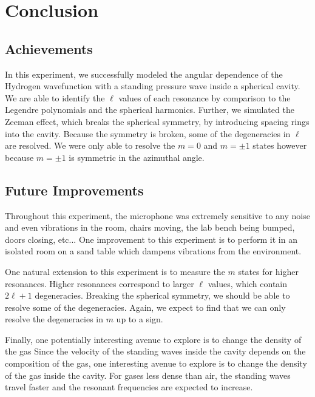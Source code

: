 \documentclass[12pt]{article}
\begin{document}
\section{Conclusion}

	\subsection{Achievements}
	In this experiment, we successfully modeled the angular dependence of the Hydrogen wavefunction with a standing pressure wave inside a spherical cavity. We are able to identify the $\ell$ values of each resonance by comparison to the Legendre polynomials and the spherical harmonics. Further, we simulated the Zeeman effect, which breaks the spherical symmetry, by introducing spacing rings into the cavity. Because the symmetry is broken, some of the degeneracies in $\ell$ are resolved. We were only able to resolve the $m=0$ and $m=\pm1$ states however because $m=\pm1$ is symmetric in the azimuthal angle.

	\subsection{Future Improvements}
	Throughout this experiment, the microphone was extremely sensitive to any noise and even vibrations in the room, chairs moving, the lab bench being bumped, doors closing, etc... One improvement to this experiment is to perform it in an isolated room on a sand table which dampens vibrations from the environment.
	
	One natural extension to this experiment is to measure the $m$ states for higher resonances. Higher resonances correspond to larger $\ell$ values, which contain $2\ell + 1$ degeneracies. Breaking the spherical symmetry, we should be able to resolve some of the degeneracies. Again, we expect to find that we can only resolve the degeneracies in $m$ up to a sign. 
	
	Finally, one potentially interesting avenue to explore is to change the density of the gas 
	Since the velocity of the standing waves inside the cavity depends on the composition of the gas, one interesting avenue to explore is to change the density of the gas inside the cavity. For gases less dense than air, the standing waves travel faster and the resonant frequencies are expected to increase. 
	
	
	


\newpage

\nocite{*} %

\end{document}
